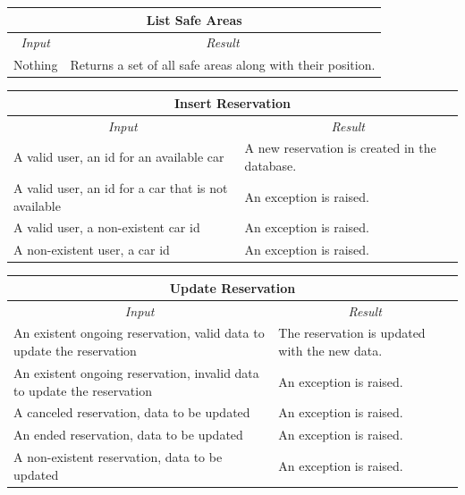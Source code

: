 \documentclass[english]{article}
\begin{document}
\begin{center}
	\begin{tabular}{ | p{6cm} | p{6cm} | }
		\hline 
		\multicolumn{2}{|c|}{\textbf{List Safe Areas}} \\
		\hline
		\multicolumn{1}{|c|}{\textit{Input}} & \multicolumn{1}{c|}{\textit{Result}} \\
		\hline
		Nothing & Returns a set of all safe areas along with their position. \\
		\hline
	\end{tabular}
\end{center}

\begin{center}
	\begin{tabular}{ | p{6cm} | p{6cm} | }
		\hline 
		\multicolumn{2}{|c|}{\textbf{Insert Reservation}} \\
		\hline
		\multicolumn{1}{|c|}{\textit{Input}} & \multicolumn{1}{c|}{\textit{Result}} \\
		\hline
		A valid user, an id for an available car & A new reservation is created in the database. \\
		\hline
		A valid user, an id for a car that is not available & An exception is raised. \\
		\hline
		A valid user, a non-existent car id & An exception is raised. \\
		\hline
		A non-existent user, a car id & An exception is raised. \\
		\hline
	\end{tabular}
\end{center}

\begin{center}
	\begin{tabular}{ | p{6cm} | p{6cm} | }
		\hline
		\multicolumn{2}{|c|}{\textbf{Update Reservation}} \\
		\hline
		\multicolumn{1}{|c|}{\textit{Input}} & \multicolumn{1}{c|}{\textit{Result}} \\
		\hline
		An existent ongoing reservation, valid data to update the reservation & The reservation is updated with the new data. \\
		\hline
		An existent ongoing reservation, invalid data to update the reservation & An exception is raised. \\
		\hline
		A canceled reservation, data to be updated& An exception is raised. \\
		\hline
		An ended reservation, data to be updated & An exception is raised. \\
		\hline
		A non-existent reservation, data to be updated & An exception is raised. \\
		\hline
	\end{tabular}
\end{center}
\end{document}

